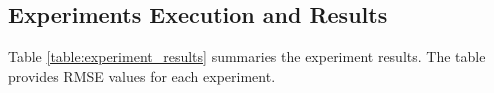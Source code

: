 \documentclass[sn-mathphys]{sn-jnl}%
\theoremstyle{thmstyleone}%
\theoremstyle{thmstyletwo}%
\theoremstyle{thmstylethree}%
\begin{document}
\subsection{Experiments Execution and Results}

Table \ref{table:experiment_results} summaries the experiment results.
The table provides RMSE values for each experiment.



\end{document}
